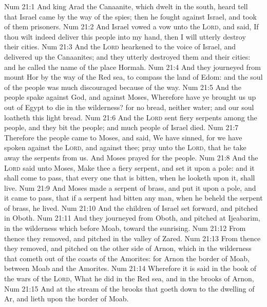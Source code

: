 \vs Num 21:1 And  king Arad the Canaanite, which dwelt in the south, heard tell that Israel came by the way of the spies; then he fought against Israel, and took  of them prisoners.
\vs Num 21:2 And Israel vowed a vow unto the \textsc{Lord}, and said, If thou wilt indeed deliver this people into my hand, then I will utterly destroy their cities.
\vs Num 21:3 And the \textsc{Lord} hearkened to the voice of Israel, and delivered up the Canaanites; and they utterly destroyed them and their cities: and he called the name of the place Hormah.
\vs Num 21:4 And they journeyed from mount Hor by the way of the Red sea, to compass the land of Edom: and the soul of the people was much discouraged because of the way.
\vs Num 21:5 And the people spake against God, and against Moses, Wherefore have ye brought us up out of Egypt to die in the wilderness? for  no bread, neither  water; and our soul loatheth this light bread.
\vs Num 21:6 And the \textsc{Lord} sent fiery serpents among the people, and they bit the people; and much people of Israel died.
\vs Num 21:7 Therefore the people came to Moses, and said, We have sinned, for we have spoken against the \textsc{Lord}, and against thee; pray unto the \textsc{Lord}, that he take away the serpents from us. And Moses prayed for the people.
\vs Num 21:8 And the \textsc{Lord} said unto Moses, Make thee a fiery serpent, and set it upon a pole: and it shall come to pass, that every one that is bitten, when he looketh upon it, shall live.
\vs Num 21:9 And Moses made a serpent of brass, and put it upon a pole, and it came to pass, that if a serpent had bitten any man, when he beheld the serpent of brass, he lived.
\vs Num 21:10 And the children of Israel set forward, and pitched in Oboth.
\vs Num 21:11 And they journeyed from Oboth, and pitched at Ijeabarim, in the wilderness which  before Moab, toward the sunrising.
\vs Num 21:12 From thence they removed, and pitched in the valley of Zared.
\vs Num 21:13 From thence they removed, and pitched on the other side of Arnon, which  in the wilderness that cometh out of the coasts of the Amorites: for Arnon  the border of Moab, between Moab and the Amorites.
\vs Num 21:14 Wherefore it is said in the book of the wars of the \textsc{Lord}, What he did in the Red sea, and in the brooks of Arnon,
\vs Num 21:15 And at the stream of the brooks that goeth down to the dwelling of Ar, and lieth upon the border of Moab.
